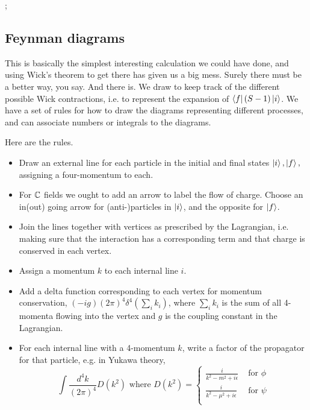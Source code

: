 ;

\subsection*{Feynman diagrams} This is basically the simplest interesting calculation we could have done, and using Wick's theorem to get there has given us a big mess. Surely there must be a better way, you say. And there is. We draw  to keep track of the different possible Wick contractions, i.e. to represent the expansion of $\left< f \right|(S-1)\left| i \right>$. We have a set of rules for how to draw the diagrams representing different processes, and can associate numbers or integrals to the diagrams.

Here are the rules.
\begin{itemize}
    \item Draw an external line for each particle in the initial and final states $\left| i \right>,\left| f \right>,$ assigning a four-momentum to each. 
    \item For $\mathbb{C}$ fields we ought to add an arrow to label the flow of charge. Choose an in(out) going arrow for (anti-)particles in $\left| i \right>$, and the opposite for $\left| f \right>$.
    \item Join the lines together with vertices as prescribed by the Lagrangian, i.e. making sure that the interaction has a corresponding term and that charge is conserved in each vertex.
    \item Assign a momentum $k$ to each internal line $i$.
    \item Add a delta function corresponding to each vertex for momentum conservation, $(-ig)(2\pi)^4 \delta^4(\sum_i k_i)$, where $\sum_i k_i$ is the sum of all 4-momenta flowing into the vertex and $g$ is the coupling constant in the Lagrangian.
    \item For each internal line with a 4-momentum $k$, write a factor of the propagator for that particle, e.g. in Yukawa theory,
    $$\int \frac{d^4k}{(2\pi)^4} D(k^2)\text{ where }D(k^2)=\begin{cases}
    \frac{i}{k^2-m^2+i\epsilon} & \text{ for }\phi\\
    \frac{i}{k^2-\mu^2+i\epsilon} & \text{ for }\psi\\
    \end{cases}$$
\end{itemize}

